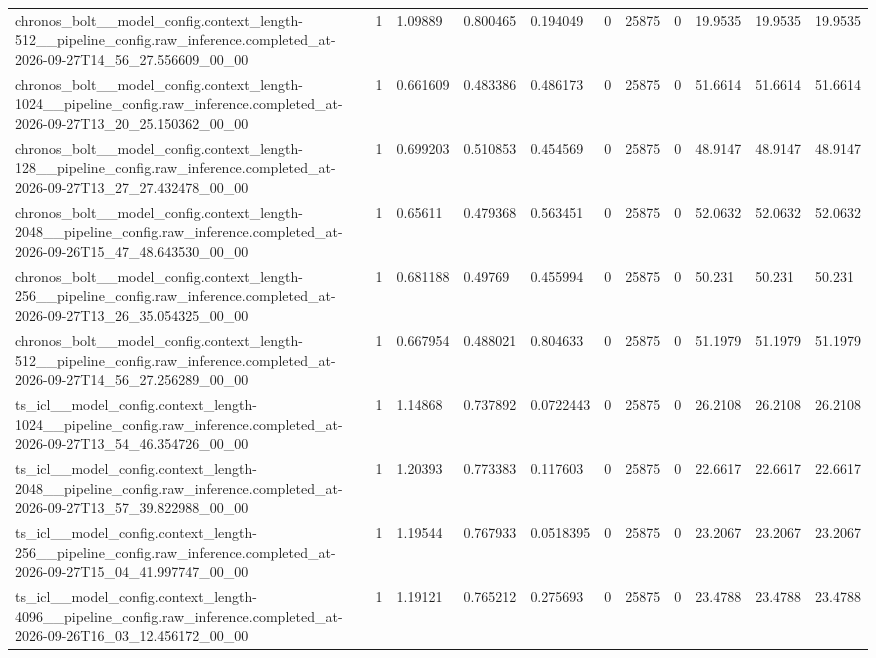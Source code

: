 \begin{tabular}{lllllllllll}
chronos\_bolt\_\_model\_config.context\_length-512\_\_pipeline\_config.raw\_inference.completed\_at-2026-09-27T14\_56\_27.556609\_00\_00 & 1 & 1.09889 & 0.800465 & 0.194049 & 0 & 25875 & 0 & 19.9535 & 19.9535 & 19.9535 \\
chronos\_bolt\_\_model\_config.context\_length-1024\_\_pipeline\_config.raw\_inference.completed\_at-2026-09-27T13\_20\_25.150362\_00\_00 & 1 & 0.661609 & 0.483386 & 0.486173 & 0 & 25875 & 0 & 51.6614 & 51.6614 & 51.6614 \\
chronos\_bolt\_\_model\_config.context\_length-128\_\_pipeline\_config.raw\_inference.completed\_at-2026-09-27T13\_27\_27.432478\_00\_00 & 1 & 0.699203 & 0.510853 & 0.454569 & 0 & 25875 & 0 & 48.9147 & 48.9147 & 48.9147 \\
chronos\_bolt\_\_model\_config.context\_length-2048\_\_pipeline\_config.raw\_inference.completed\_at-2026-09-26T15\_47\_48.643530\_00\_00 & 1 & 0.65611 & 0.479368 & 0.563451 & 0 & 25875 & 0 & 52.0632 & 52.0632 & 52.0632 \\
chronos\_bolt\_\_model\_config.context\_length-256\_\_pipeline\_config.raw\_inference.completed\_at-2026-09-27T13\_26\_35.054325\_00\_00 & 1 & 0.681188 & 0.49769 & 0.455994 & 0 & 25875 & 0 & 50.231 & 50.231 & 50.231 \\
chronos\_bolt\_\_model\_config.context\_length-512\_\_pipeline\_config.raw\_inference.completed\_at-2026-09-27T14\_56\_27.256289\_00\_00 & 1 & 0.667954 & 0.488021 & 0.804633 & 0 & 25875 & 0 & 51.1979 & 51.1979 & 51.1979 \\
ts\_icl\_\_model\_config.context\_length-1024\_\_pipeline\_config.raw\_inference.completed\_at-2026-09-27T13\_54\_46.354726\_00\_00 & 1 & 1.14868 & 0.737892 & 0.0722443 & 0 & 25875 & 0 & 26.2108 & 26.2108 & 26.2108 \\
ts\_icl\_\_model\_config.context\_length-2048\_\_pipeline\_config.raw\_inference.completed\_at-2026-09-27T13\_57\_39.822988\_00\_00 & 1 & 1.20393 & 0.773383 & 0.117603 & 0 & 25875 & 0 & 22.6617 & 22.6617 & 22.6617 \\
ts\_icl\_\_model\_config.context\_length-256\_\_pipeline\_config.raw\_inference.completed\_at-2026-09-27T15\_04\_41.997747\_00\_00 & 1 & 1.19544 & 0.767933 & 0.0518395 & 0 & 25875 & 0 & 23.2067 & 23.2067 & 23.2067 \\
ts\_icl\_\_model\_config.context\_length-4096\_\_pipeline\_config.raw\_inference.completed\_at-2026-09-26T16\_03\_12.456172\_00\_00 & 1 & 1.19121 & 0.765212 & 0.275693 & 0 & 25875 & 0 & 23.4788 & 23.4788 & 23.4788 \\

\end{tabular}
